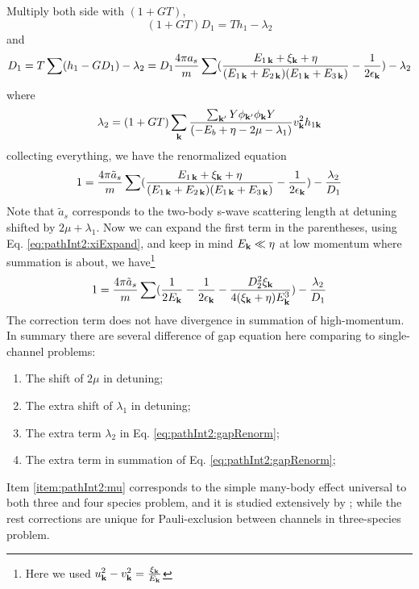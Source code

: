 Multiply both side with $(1+GT)$, 
\begin{equation*}
(1+GT)D_{1}=Th_{1}-\lambda_{2}
\end{equation*}
and 
\begin{equation}
D_{1}=T\sum(h_{1}-GD_{1})-\lambda_{2}
=D_{1}\frac{4\pi{a_{s}}}{m}\sum(\frac{E_{1\,\mathbf{k}}+\xi_{\mathbf{k}}+\eta}{(E_{1\,\mathbf{k}}+E_{2\,\mathbf{k}})(E_{1\,\mathbf{k}}+E_{3\,\mathbf{k}})}-\frac{1}{2\epsilon_{\mathbf{k}}})
	-\lambda_{2}
\end{equation}
where 
\begin{equation}\label{eq:pathInt2:lambda2}
\lambda_{2}=(1+GT)\sum_{\mathbf{k}}\frac{\sum_{\mathbf{k}'}Y{\phi_{\mathbf{k}'}}{\phi_{\mathbf{k}}}{Y}}{\left(-E_{b}+\eta-2\mu-\lambda_{1}\right)}v_{\mathbf{k}}^{2}{{h_{1\mathbf{k}}}}
\end{equation}
collecting everything, we have the renormalized equation
\begin{equation}
1=\frac{4\pi{\tilde{a}_{s}}}{m}\sum(\frac{E_{1\,\mathbf{k}}+\xi_{\mathbf{k}}+\eta}{(E_{1\,\mathbf{k}}+E_{2\,\mathbf{k}})(E_{1\,\mathbf{k}}+E_{3\,\mathbf{k}})}-\frac{1}{2\epsilon_{\mathbf{k}}})
	-\frac{\lambda_{2}}{D_{1}}
\end{equation}
Note that $\tilde{a}_{s}$ corresponds to the two-body s-wave scattering length at detuning shifted by $2\mu+\lambda_{1}$.
Now we can expand the first term in the parentheses, using Eq. \ref{eq:pathInt2:xiExpand}, and keep in mind $E_{\mathbf{k}}\ll{\eta}$ at low momentum where summation is about, we have\footnote{Here we used $u_{\mathbf{k}}^{2}-v_{\mathbf{k}}^{2}=\frac{\xi_{\mathbf{k}}}{E_{\mathbf{k}}}$}
\begin{equation}\label{eq:pathInt2:gapRenorm}
1=\frac{4\pi{\tilde{a}_{s}}}{m}\sum(\frac{1}{2E_{\mathbf{k}}}-\frac{1}{2\epsilon_{\mathbf{k}}}-\frac{D_{2}^{2}\xi_{\mathbf{k}}}{4(\xi_{\mathbf{k}}+\eta){E_{\mathbf{k}}^{3}}})
	-\frac{\lambda_{2}}{D_{1}}
\end{equation}
The correction term does not have divergence in summation of high-momentum. 
In summary there are several difference of gap equation here comparing to single-channel problems:
\begin{enumerate}
\item\label{item:pathInt2:mu}The shift of $2\mu$ in detuning;
\item The extra shift of $\lambda_{1}$ in detuning;
\item The extra term $\lambda_{2}$ in Eq. \ref{eq:pathInt2:gapRenorm};
\item The extra term  in summation of Eq. \ref{eq:pathInt2:gapRenorm};
\end{enumerate}
Item \ref{item:pathInt2:mu} corresponds to the simple many-body effect  universal to both three and four species problem, and it is studied extensively by \cite{GurarieNarrow}; while the rest corrections are unique for Pauli-exclusion between channels in three-species problem.

